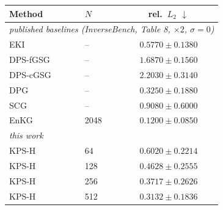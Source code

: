 \small
%
\begin{tabular}{llc}
\toprule
Method & $N$ & rel.\ $L_2$ $\downarrow$ \\
\midrule
\multicolumn{3}{l}{\emph{published baselines (InverseBench, Table 8, $\times 2$, $\sigma=0$)}} \\
EKI & -- & $0.5770 \pm 0.1380$ \\
DPS-fGSG & -- & $1.6870 \pm 0.1560$ \\
DPS-cGSG & -- & $2.2030 \pm 0.3140$ \\
DPG & -- & $0.3250 \pm 0.1880$ \\
SCG & -- & $0.9080 \pm 0.6000$ \\
EnKG & 2048 & $0.1200 \pm 0.0850$ \\
\midrule
\multicolumn{3}{l}{\emph{this work}} \\
KPS-H & 64 & $0.6020 \pm 0.2214$ \\
KPS-H & 128 & $0.4628 \pm 0.2555$ \\
KPS-H & 256 & $0.3717 \pm 0.2626$ \\
KPS-H & 512 & $0.3132 \pm 0.1836$ \\
\bottomrule
\end{tabular}
